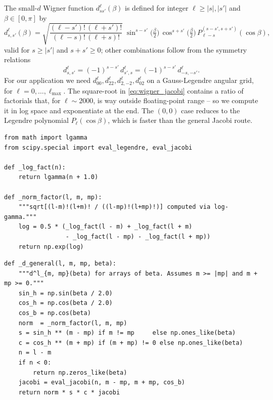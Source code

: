 The small-$d$ Wigner function $d^\ell_{ss'}(\beta)$ is defined for integer $\ell \geq |s|, |s'|$ and $\beta \in [0, \pi]$ by
\begin{equation}
  d^\ell_{s, s'}(\beta) = \sqrt{\frac{(\ell - s')!\, (\ell + s')!}{(\ell - s)!\, (\ell + s)!}}\;
                         \sin^{s - s'}\!\bigl(\tfrac{\beta}{2}\bigr)\,
                         \cos^{s + s'}\!\bigl(\tfrac{\beta}{2}\bigr)\,
                         P^{(s - s', s + s')}_{\ell - s}(\cos\beta),
  \label{eq:wigner_jacobi}
\end{equation}
valid for $s \geq |s'|$ and $s + s' \geq 0$; other combinations follow from the symmetry relations
\[
  d^\ell_{s, s'} = (-1)^{s - s'}\, d^\ell_{s', s} = (-1)^{s - s'}\, d^\ell_{-s, -s'}.
\]
For our application we need $d^\ell_{00}, d^\ell_{22}, d^\ell_{2,-2}, d^\ell_{02}$ on a Gauss-Legendre angular grid, for $\ell = 0, \ldots, \ell_\mathrm{max}$. The square-root in \cref{eq:wigner_jacobi} contains a ratio of factorials that, for $\ell \sim 2000$, is way outside floating-point range -- so we compute it in log space and exponentiate at the end. The $(0, 0)$ case reduces to the Legendre polynomial $P_\ell(\cos\beta)$, which is faster than the general Jacobi route.

\begin{codebox}
\begin{lstlisting}[style=python]
from math import lgamma
from scipy.special import eval_legendre, eval_jacobi

def _log_fact(n):
    return lgamma(n + 1.0)

def _norm_factor(l, m, mp):
    """sqrt[(l-m)!(l+m)! / ((l-mp)!(l+mp)!)] computed via log-gamma."""
    log = 0.5 * (_log_fact(l - m) + _log_fact(l + m)
                 - _log_fact(l - mp) - _log_fact(l + mp))
    return np.exp(log)
\end{lstlisting}
\end{codebox}

\begin{codebox}
\begin{lstlisting}[style=python]
def _d_general(l, m, mp, beta):
    """d^l_{m, mp}(beta) for arrays of beta. Assumes m >= |mp| and m + mp >= 0."""
    sin_h = np.sin(beta / 2.0)
    cos_h = np.cos(beta / 2.0)
    cos_b = np.cos(beta)
    norm  = _norm_factor(l, m, mp)
    s = sin_h ** (m - mp) if m != mp     else np.ones_like(beta)
    c = cos_h ** (m + mp) if (m + mp) != 0 else np.ones_like(beta)
    n = l - m
    if n < 0:
        return np.zeros_like(beta)
    jacobi = eval_jacobi(n, m - mp, m + mp, cos_b)
    return norm * s * c * jacobi
\end{lstlisting}
\end{codebox}

